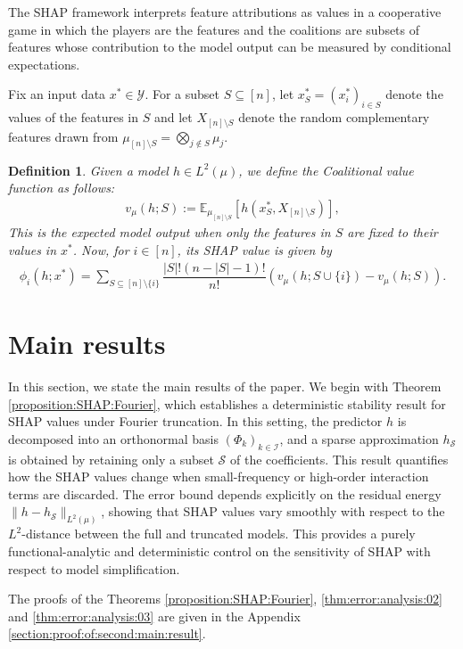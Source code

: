 \documentclass[letterpaper,11pt]{article}
\numberwithin{equation}{section}
\newtheorem{definition}[theorem]{Definition}
\numberwithin{equation}{section}
\begin{document}
The SHAP framework interprets feature attributions as values in a cooperative game in which the players are the features and the coalitions are subsets of features whose contribution to the model output can be measured by conditional expectations.

Fix an input data $x^*\in \mathcal{Y}$. For a subset $S\subseteq [n]$, let $x_S^*=(x_i^*)_{i\in S}$ denote the values of the features in $S$ and let $X_{[n]\setminus S}$ denote the random complementary features drawn from $\mu_{[n]\setminus S}=\bigotimes_{j\notin S} \mu_j$.

\begin{definition} 
Given a model $h\in L^2(\mu)$, we define the Coalitional value function as follows: 
\begin{align*}
    v_\mu(h;S):=\mathbb{E}_{\mu_{[n]\setminus S}} [h(x_S^*,X_{[n]\setminus S})],
\end{align*}
This is the expected model output when only the features in $S$ are fixed to their values in $x^*$. Now, for $i\in [n]$, its SHAP value is given by 
\begin{align}
    \label{SHAP:formula}
    \phi_i(h;x^*)=\sum_{S\subseteq [n]\setminus \{i\}} \dfrac{|S|! (n-|S|-1)!}{n!} (v_\mu (h; S\cup \{i\}) - v_\mu (h;S)).
\end{align}
\end{definition}

\section{Main results}
\label{section:SHAP:decomposition}
In this section, we state the main results of the paper. We begin with Theorem \ref{proposition:SHAP:Fourier}, which establishes a deterministic stability result for SHAP values under Fourier truncation. In this setting, the predictor $h$ is decomposed into an orthonormal basis $(\Phi_k)_{k\in \mathcal{I}}$, and a sparse approximation $h_{\mathcal{S}}$ is obtained by retaining only a subset $\mathcal{S}$ of the coefficients. This result quantifies how the SHAP values change when small-frequency or high-order interaction terms are discarded. The error bound depends explicitly on the residual energy $\|h-h_{\mathcal{S}}\|_{L^2(\mu)}$, showing that SHAP values vary smoothly with respect to the $L^2$-distance between the full and truncated models. This provides a purely functional-analytic and deterministic control on the sensitivity of SHAP with respect to model simplification.

The proofs of the Theorems \ref{proposition:SHAP:Fourier}, \ref{thm:error:analysis:02} and \ref{thm:error:analysis:03} are given in the Appendix \ref{section:proof:of:second:main:result}.
\end{document}
